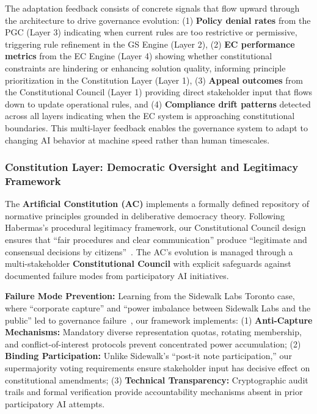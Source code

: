 The adaptation feedback consists of concrete signals that flow upward through the architecture to drive governance evolution: (1) \textbf{Policy denial rates} from the PGC (Layer 3) indicating when current rules are too restrictive or permissive, triggering rule refinement in the GS Engine (Layer 2), (2) \textbf{EC performance metrics} from the EC Engine (Layer 4) showing whether constitutional constraints are hindering or enhancing solution quality, informing principle prioritization in the Constitution Layer (Layer 1), (3) \textbf{Appeal outcomes} from the Constitutional Council (Layer 1) providing direct stakeholder input that flows down to update operational rules, and (4) \textbf{Compliance drift patterns} detected across all layers indicating when the EC system is approaching constitutional boundaries. This multi-layer feedback enables the governance system to adapt to changing AI behavior at machine speed rather than human timescales.

\subsubsection{Constitution Layer: Democratic Oversight and Legitimacy Framework}
The \textbf{Artificial Constitution (AC)} implements a formally defined repository of normative principles grounded in deliberative democracy theory. Following Habermas's procedural legitimacy framework, our Constitutional Council design ensures that ``fair procedures and clear communication'' produce ``legitimate and consensual decisions by citizens''~\cite{habermas1996between}. The AC's evolution is managed through a multi-stakeholder \textbf{Constitutional Council} with explicit safeguards against documented failure modes from participatory AI initiatives.

\textbf{Failure Mode Prevention:} Learning from the Sidewalk Labs Toronto case, where ``corporate capture'' and ``power imbalance between Sidewalk Labs and the public'' led to governance failure~\cite{sidewalklabs2020lessons}, our framework implements: (1) \textbf{Anti-Capture Mechanisms:} Mandatory diverse representation quotas, rotating membership, and conflict-of-interest protocols prevent concentrated power accumulation; (2) \textbf{Binding Participation:} Unlike Sidewalk's ``post-it note participation,'' our supermajority voting requirements ensure stakeholder input has decisive effect on constitutional amendments; (3) \textbf{Technical Transparency:} Cryptographic audit trails and formal verification provide accountability mechanisms absent in prior participatory AI attempts.

